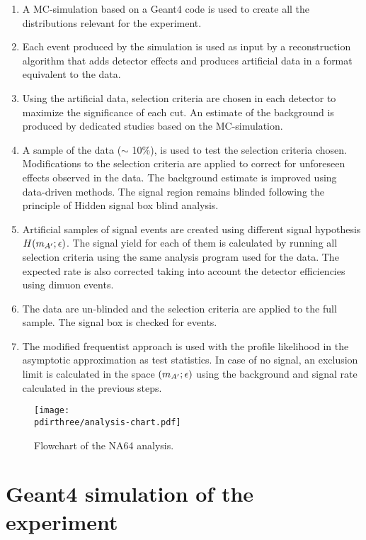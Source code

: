 \begin{enumerate}
\item A MC-simulation based on a Geant4 code is used to create all the distributions relevant for the experiment.
\item Each event produced by the simulation is used as input by a reconstruction algorithm that adds detector effects and produces artificial data in a format equivalent to the data.
\item Using the artificial data, selection criteria are chosen in each detector to maximize the significance of each cut. An estimate of the background is produced by dedicated studies based on the MC-simulation.
\item A sample of the data ($\sim$ 10\%), is used to test the selection criteria chosen. Modifications to the selection criteria are applied to correct for unforeseen effects observed in the data. The background estimate is improved using data-driven methods. The signal region remains blinded following the principle of Hidden signal box blind analysis.
\item Artificial samples of signal events are created using different signal hypothesis $H(m_{A'};\epsilon)$. The signal yield for each of them is calculated by running all selection criteria using the same analysis program used for the data. The expected rate is also corrected taking into account the detector efficiencies using dimuon events.
\item The data are un-blinded and the selection criteria are applied to the full sample. The signal box is checked for events.
\item The modified frequentist approach is used with the profile likelihood in the asymptotic approximation as test statistics. In case of no signal, an exclusion limit is calculated in the space $(m_{A'};\epsilon)$ using the background and signal rate calculated in the previous steps.
\end{enumerate}

\begin{figure}[bth!]
  \centering
  \texttt{[image: \\pdirthree/analysis-chart.pdf]}
  \caption{Flowchart of the NA64 analysis.}
  \label{fig:analysis-chart}
\end{figure}

\section{Geant4 simulation of the experiment}
\label{ch3:sec:geant4}

